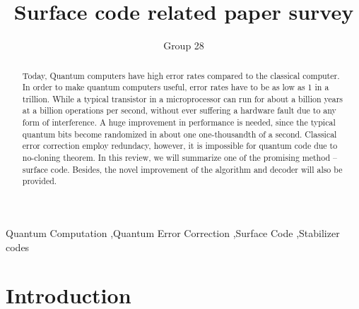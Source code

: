 \documentclass[final,5p,times,twocolumn,authoryear]{elsarticle}
\begin{document}
\begin{frontmatter}

    \title{Surface code related paper survey}

    \author{Group 28}

    \begin{abstract}
        Today, Quantum computers have high error rates compared to the classical computer. In order to make quantum computers useful, error rates have to be as low as 1 in a trillion. While a typical transistor in a microprocessor can run for about a billion years at a billion operations per second, without ever suffering a hardware fault due to any form of interference. A huge improvement in performance is needed, since the typical quantum bits become randomized in about one one-thousandth of a second. Classical error correction employ redundacy, however, it is impossible for quantum code due to no-cloning theorem. In this review, we will summarize one of the promising method – surface code. Besides, the novel improvement of the algorithm and decoder will also be provided.
    \end{abstract}

    \begin{keyword}
        Quantum Computation \sep Quantum Error Correction \sep Surface Code \sep Stabilizer codes
    \end{keyword}


\end{frontmatter}




\section{Introduction}
\label{introduction}











\end{document}
